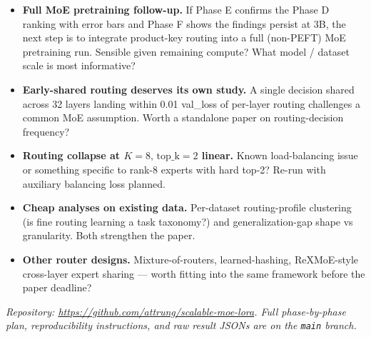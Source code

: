 \documentclass[10pt]{article}
\begin{document}
\begin{itemize}\setlength\itemsep{0pt}
  \item \textbf{Full MoE pretraining follow-up.} If Phase E confirms the Phase D ranking with error bars and Phase F shows the findings persist at 3B, the next step is to integrate product-key routing into a full (non-PEFT) MoE pretraining run. Sensible given remaining compute? What model / dataset scale is most informative?
  \item \textbf{Early-shared routing deserves its own study.} A single decision shared across 32 layers landing within 0.01 val\_loss of per-layer routing challenges a common MoE assumption. Worth a standalone paper on routing-decision frequency?
  \item \textbf{Routing collapse at $K{=}8,\,\text{top\_k}{=}2$ linear.} Known load-balancing issue or something specific to rank-8 experts with hard top-2? Re-run with auxiliary balancing loss planned.
  \item \textbf{Cheap analyses on existing data.} Per-dataset routing-profile clustering (is fine routing learning a task taxonomy?) and generalization-gap shape vs granularity. Both strengthen the paper.
  \item \textbf{Other router designs.} Mixture-of-routers, learned-hashing, ReXMoE-style cross-layer expert sharing --- worth fitting into the same framework before the paper deadline?
\end{itemize}

\vspace{0.6em}
\noindent\small\textit{Repository: \url{https://github.com/attrung/scalable-moe-lora}. Full phase-by-phase plan, reproducibility instructions, and raw result JSONs are on the \texttt{main} branch.}
\end{document}
